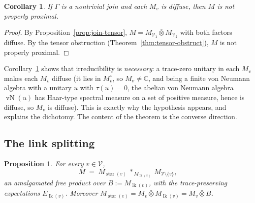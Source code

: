 \documentclass[11pt]{article}
\newtheorem{proposition}{Proposition}
\newtheorem{corollary}{Corollary}
\DeclareMathOperator{\vN}{vN}
\DeclareMathOperator{\link}{lk}
\DeclareMathOperator{\str}{star}
\newcommand{\Gra}{\Gamma}
\newcommand{\VV}{\mathcal V}
\newcommand{\set}[1]{\{#1\}}
\begin{document}
\begin{corollary}\label{cor:join-not-pp}
If $\Gra$ is a nontrivial join and each $M_v$ is diffuse, then $M$ is \emph{not} properly proximal.
\end{corollary}

\begin{proof}
By Proposition~\ref{prop:join-tensor}, $M=M_{\VV_1}\bar\otimes M_{\VV_2}$ with both factors diffuse. By the
tensor obstruction (Theorem~\ref{thm:tensor-obstruct}), $M$ is not properly proximal.
\end{proof}

Corollary~\ref{cor:join-not-pp} shows that irreducibility is \emph{necessary}: a trace-zero unitary in each
$M_v$ makes each $M_v$ diffuse (it lies in $M_v^\circ$, so $M_v\ne\mathbb C$, and being a finite von Neumann
algebra with a unitary $u$ with $\tau(u)=0$, the abelian von Neumann algebra $\vN(u)$ has Haar-type spectral
measure on a set of positive measure, hence is diffuse, so $M_v$ is diffuse). This is exactly why the
hypothesis appears, and explains the dichotomy. The content of the theorem is the converse direction.

\subsection*{The link splitting}

\begin{proposition}\label{prop:link-split}
For every $v\in\VV$,
\[
M\;=\;M_{\str(v)}\ \ast_{\,M_{\link(v)}}\ M_{\VV\setminus\set v},
\]
an amalgamated free product over $B:=M_{\link(v)}$, with the trace-preserving expectations
$E_{\link(v)}$. Moreover $M_{\str(v)}=M_v\bar\otimes M_{\link(v)}=M_v\bar\otimes B$.
\end{proposition}
\end{document}
